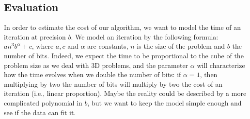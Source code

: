 \subsection{Evaluation}

In order to estimate the cost of our algorithm, we want to model the time of an
iteration at precision $b$. We model an iteration by the following formula:
$an^3b^\alpha+c$, where $a,c$ and $\alpha$ are constants, $n$ is the size of
the problem and $b$ the number of bits. Indeed, we expect the time to be
proportional to the cube of the problem size as we deal with 3D problems, and
the parameter $\alpha$ will characterize how the time evolves when we double
the number of bits: if $\alpha = 1$, then multiplying by two the number of bits
will multiply by two the cost of an iteration (i.e., linear proportion). Maybe
the reality could be described by a more complicated polynomial in $b$, but we
want to keep the model simple enough and see if the data can fit it.


